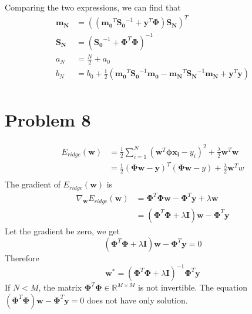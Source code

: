 \documentclass[12pt]{scrartcl}
\begin{document}
    Comparing the two expressions, we can find that \[
        \begin{split}
            \boldsymbol{m_N} &= \left( \left( \boldsymbol{m_0}^{T}\boldsymbol{S_0}^{-1} + \boldsymbol{y}^{T}\boldsymbol{\Phi} \right) \boldsymbol{S_N} \right) ^{T} \\ 
            \boldsymbol{S_N} &= \left( \boldsymbol{S_0}^{-1}+\boldsymbol{\Phi}^{T}\boldsymbol{\Phi} \right) ^{-1} \\
            a_N &= \frac{N}{2}+a_0 \\
            b_N &= b_0+ \frac{1}{2}\left( \boldsymbol{m_0}^{T}\boldsymbol{S_0}^{-1}\boldsymbol{m_0} - \boldsymbol{m_N}^{T}\boldsymbol{S_N}^{-1}\boldsymbol{m_N} + \boldsymbol{y}^{T}\boldsymbol{y}  \right)\\
        \end{split}
        \]


    
  \section*{Problem 8}
  \[
      \begin{aligned}
        E_{ridge}\left( \boldsymbol{w} \right) &=   \frac{1}{2} \sum^{N}_{i=1} \left( \boldsymbol{w}^{T} \boldsymbol{\phi}\boldsymbol{x_i} - y_i \right) ^{2} + \frac{\lambda}{2}\boldsymbol{w}^{T}\boldsymbol{w} \\ &= \frac{1}{2}\left( \boldsymbol{\Phi w} - \boldsymbol{y} \right) ^{T}\left( \boldsymbol{\Phi w}- y \right)  + \frac{\lambda}{2}\boldsymbol{w}^{T}w  \\
      \end{aligned}
  \] 
  The gradient of $E_{ridge}\left( \boldsymbol{w} \right)$ is
  \[
      \begin{aligned}
  \nabla _{\boldsymbol{w}}E_{ridge}\left( \boldsymbol{w} \right) &=  \boldsymbol{\Phi}^{T}\boldsymbol{\Phi w}  - \boldsymbol{\Phi}^{T}\boldsymbol{y} + \lambda \boldsymbol{w} \\ &= \left( \boldsymbol{\Phi}^{T}\boldsymbol{\Phi} + \lambda \boldsymbol{I} \right) \boldsymbol{w} - \boldsymbol{\Phi}^{T}\boldsymbol{y} 
      \end{aligned}
  \] 
  Let the gradient be zero, we get 
  \[
   \left( \boldsymbol{\Phi}^{T}\boldsymbol{\Phi} + \lambda \boldsymbol{I} \right) \boldsymbol{w} - \boldsymbol{\Phi}^{T}\boldsymbol{y} = 0 
  \] 
  Therefore
  \[
  \boldsymbol{w^{*}} = \left( \boldsymbol{\Phi}^{T}\boldsymbol{\Phi} + \lambda \boldsymbol{I} \right) ^{-1}\boldsymbol{\Phi}^{T}\boldsymbol{y}  
  \] 
  If $N < M$, the matrix $\boldsymbol{\Phi}^{T}\boldsymbol{\Phi} \in \mathbb{R}^{M\times M}$ is not invertible. The equation $   \left( \boldsymbol{\Phi}^{T}\boldsymbol{\Phi} \right) \boldsymbol{w} - \boldsymbol{\Phi}^{T}\boldsymbol{y} = 0 
$ does not have only solution.
\end{document}
